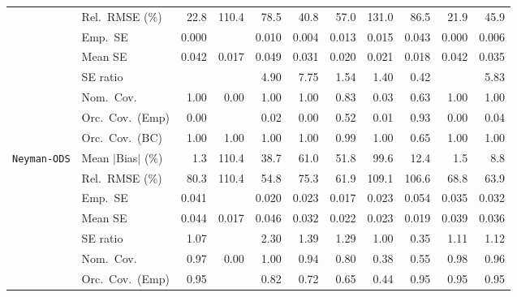 \begin{landscape}
\begin{longtable}{llrrrrrrrrr}
 & Rel.\ RMSE (\%) & \cellcolor{ranktwo}22.8 & 110.4 & 78.5 & \cellcolor{rankthree}40.8 & 57.0 & 131.0 & 86.5 & \cellcolor{rankone}21.9 & 45.9 \\
 & Emp.\ SE & 0.000 &  & 0.010 & 0.004 & 0.013 & 0.015 & 0.043 & 0.000 & 0.006 \\
 & Mean SE & 0.042 & 0.017 & 0.049 & 0.031 & 0.020 & 0.021 & 0.018 & 0.042 & 0.035 \\
 & SE ratio &  &  & 4.90 & 7.75 & \cellcolor{ranktwo}1.54 & \cellcolor{rankone}1.40 & \cellcolor{rankthree}0.42 &  & 5.83 \\
 & Nom.\ Cov. & \cellcolor{rankone}1.00 & 0.00 & \cellcolor{rankone}1.00 & \cellcolor{rankone}1.00 & \cellcolor{ranktwo}0.83 & 0.03 & \cellcolor{rankthree}0.63 & \cellcolor{rankone}1.00 & \cellcolor{rankone}1.00 \\
 & Orc.\ Cov.\ (Emp) & 0.00 &  & 0.02 & 0.00 & \cellcolor{ranktwo}0.52 & 0.01 & \cellcolor{rankone}0.93 & 0.00 & \cellcolor{rankthree}0.04 \\
 & Orc.\ Cov.\ (BC) & \cellcolor{ranktwo}1.00 & \cellcolor{ranktwo}1.00 & \cellcolor{ranktwo}1.00 & \cellcolor{ranktwo}1.00 & \cellcolor{rankone}0.99 & \cellcolor{ranktwo}1.00 & \cellcolor{rankthree}0.65 & \cellcolor{ranktwo}1.00 & \cellcolor{ranktwo}1.00 \\
\addlinespace[2pt]
\quad \texttt{Neyman-ODS} & Mean $|$Bias$|$ (\%) & \cellcolor{rankone}1.3 & 110.4 & 38.7 & 61.0 & 51.8 & 99.6 & 12.4 & \cellcolor{ranktwo}1.5 & \cellcolor{rankthree}8.8 \\
 & Rel.\ RMSE (\%) & 80.3 & 110.4 & \cellcolor{rankone}54.8 & 75.3 & \cellcolor{ranktwo}61.9 & 109.1 & 106.6 & 68.8 & \cellcolor{rankthree}63.9 \\
 & Emp.\ SE & 0.041 &  & 0.020 & 0.023 & 0.017 & 0.023 & 0.054 & 0.035 & 0.032 \\
 & Mean SE & 0.044 & 0.017 & 0.046 & 0.032 & 0.022 & 0.023 & 0.019 & 0.039 & 0.036 \\
 & SE ratio & \cellcolor{ranktwo}1.07 &  & 2.30 & 1.39 & 1.29 & \cellcolor{rankone}1.00 & 0.35 & \cellcolor{rankthree}1.11 & 1.12 \\
 & Nom.\ Cov. & \cellcolor{ranktwo}0.97 & 0.00 & 1.00 & \cellcolor{rankone}0.94 & 0.80 & 0.38 & 0.55 & \cellcolor{rankthree}0.98 & \cellcolor{rankone}0.96 \\
 & Orc.\ Cov.\ (Emp) & \cellcolor{rankone}0.95 &  & \cellcolor{ranktwo}0.82 & \cellcolor{rankthree}0.72 & 0.65 & 0.44 & \cellcolor{rankone}0.95 & \cellcolor{rankone}0.95 & \cellcolor{rankone}0.95 \\

\end{longtable}
\end{landscape}
